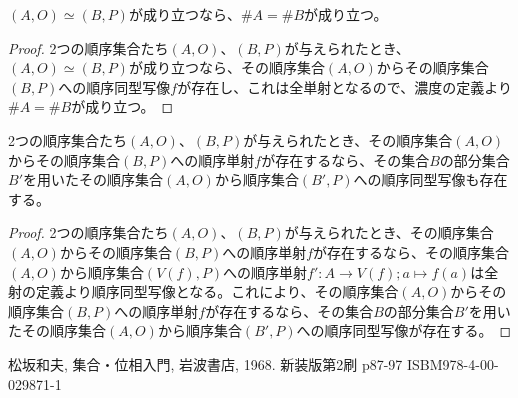 \documentclass[dvipdfmx]{jsarticle}
\begin{document}
\begin{thm}\label{1.3.1.15}
$(A,O) \simeq (B,P)$が成り立つなら、$\# A = \# B$が成り立つ。
\end{thm}
\begin{proof}
2つの順序集合たち$(A,O)$、$(B,P)$が与えられたとき、$(A,O) \simeq (B,P)$が成り立つなら、その順序集合$(A,O)$からその順序集合$(B,P)$への順序同型写像$f$が存在し、これは全単射となるので、濃度の定義より$\# A = \# B$が成り立つ。
\end{proof}
\begin{thm}\label{1.3.1.16}
2つの順序集合たち$(A,O)$、$(B,P)$が与えられたとき、その順序集合$(A,O)$からその順序集合$(B,P)$への順序単射$f$が存在するなら、その集合$B$の部分集合$B'$を用いたその順序集合$(A,O)$から順序集合$\left( B',P \right)$への順序同型写像も存在する。
\end{thm}
\begin{proof}
2つの順序集合たち$(A,O)$、$(B,P)$が与えられたとき、その順序集合$(A,O)$からその順序集合$(B,P)$への順序単射$f$が存在するなら、その順序集合$(A,O)$から順序集合$\left( V(f),P \right)$への順序単射$f':A \rightarrow V(f);a \mapsto f(a)$は全射の定義より順序同型写像となる。これにより、その順序集合$(A,O)$からその順序集合$(B,P)$への順序単射$f$が存在するなら、その集合$B$の部分集合$B'$を用いたその順序集合$(A,O)$から順序集合$\left( B',P \right)$への順序同型写像が存在する。
\end{proof}
\begin{thebibliography}{50}
    松坂和夫, 集合・位相入門, 岩波書店, 1968. 新装版第2刷 p87-97 ISBM978-4-00-029871-1
\end{thebibliography}
\end{document}
